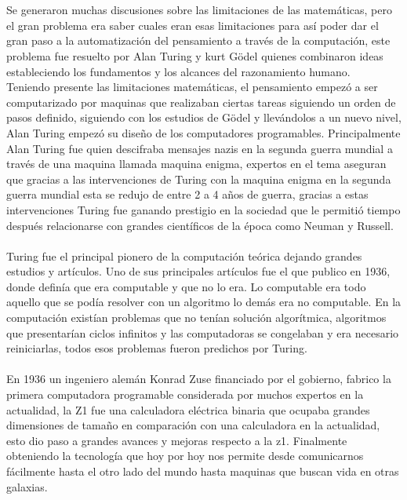 \documentclass[12pt]{article}
\begin{document}
\\\\
Se generaron muchas discusiones sobre las limitaciones de las matemáticas, pero el gran problema era saber cuales eran esas limitaciones para así poder dar el gran paso a la automatización del pensamiento a través de la computación, este problema fue resuelto por Alan Turing y kurt Gödel quienes combinaron ideas estableciendo los fundamentos y los alcances del razonamiento humano.
\\
Teniendo presente las limitaciones matemáticas, el pensamiento empezó a ser computarizado por maquinas que realizaban ciertas tareas siguiendo un orden de pasos definido, siguiendo con los estudios de Gödel y llevándolos a un nuevo nivel, Alan Turing empezó su diseño de los computadores programables. Principalmente Alan Turing fue quien descifraba mensajes nazis en la segunda guerra mundial a través de una maquina llamada maquina enigma, expertos en el tema aseguran que gracias a las intervenciones de Turing con la maquina enigma en la segunda guerra mundial esta se redujo de entre 2 a 4 años de guerra, gracias a estas intervenciones Turing fue ganando prestigio en la sociedad que le permitió tiempo después relacionarse con grandes científicos de la época como Neuman y Russell.
\\\\
Turing fue el principal pionero de la computación teórica dejando grandes estudios y artículos. Uno de sus principales artículos fue el que publico en 1936, donde definía que era computable y que no lo era. Lo computable era todo aquello que se podía resolver con un algoritmo lo demás era no computable.
En la computación existían problemas que no tenían solución algorítmica, algoritmos que presentarían ciclos infinitos y las computadoras se congelaban y era necesario reiniciarlas, todos esos problemas fueron predichos por Turing.
\\\\
En 1936 un ingeniero alemán Konrad Zuse financiado por el gobierno, fabrico la primera computadora programable considerada por muchos expertos en la actualidad, la Z1 fue una calculadora eléctrica binaria que ocupaba grandes dimensiones de tamaño en comparación con una calculadora en la actualidad, esto dio paso a grandes avances y mejoras respecto a la z1. Finalmente obteniendo la tecnología que hoy por hoy nos permite desde comunicarnos fácilmente hasta el otro lado del mundo hasta maquinas que buscan vida en otras galaxias.

\newpage
\end{document}
